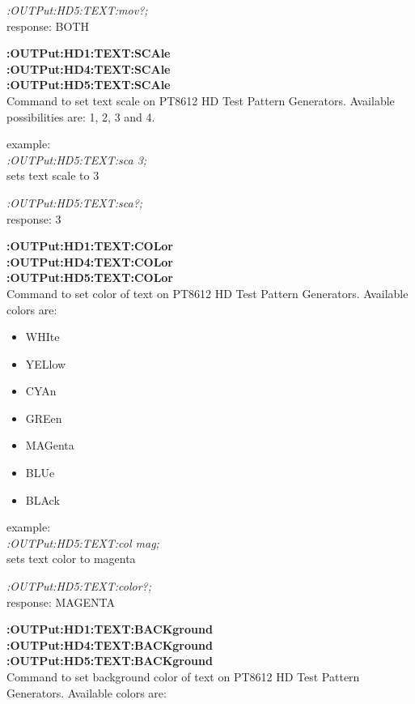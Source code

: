 \textit{:OUTPut:HD5:TEXT:mov?;}\\
response: BOTH

\textbf{:OUTPut:HD1:TEXT:SCAle}\\
\textbf{:OUTPut:HD4:TEXT:SCAle}\\
\textbf{:OUTPut:HD5:TEXT:SCAle}\\
Command to set text scale on PT8612 HD Test Pattern Generators. Available possibilities are: 1, 2, 3 and 4.

example:\\
\textit{:OUTPut:HD5:TEXT:sca 3;}\\
sets text scale to 3

\textit{:OUTPut:HD5:TEXT:sca?;}\\
response: 3

\textbf{:OUTPut:HD1:TEXT:COLor}\\
\textbf{:OUTPut:HD4:TEXT:COLor}\\
\textbf{:OUTPut:HD5:TEXT:COLor}\\

Command to set color of text on PT8612 HD Test Pattern Generators. Available colors are:

\begin{itemize}
\item WHIte \\
\item YELlow\\
\item CYAn\\
\item GREen\\
\item MAGenta\\
\item BLUe\\
\item BLAck\\
\end{itemize}

example:\\
\textit{:OUTPut:HD5:TEXT:col mag;}\\
sets text color to magenta

\textit{:OUTPut:HD5:TEXT:color?;}\\
response: MAGENTA

\textbf{:OUTPut:HD1:TEXT:BACKground}\\
\textbf{:OUTPut:HD4:TEXT:BACKground}\\
\textbf{:OUTPut:HD5:TEXT:BACKground}\\
Command to set background color of text on PT8612 HD Test Pattern Generators. Available colors are:

